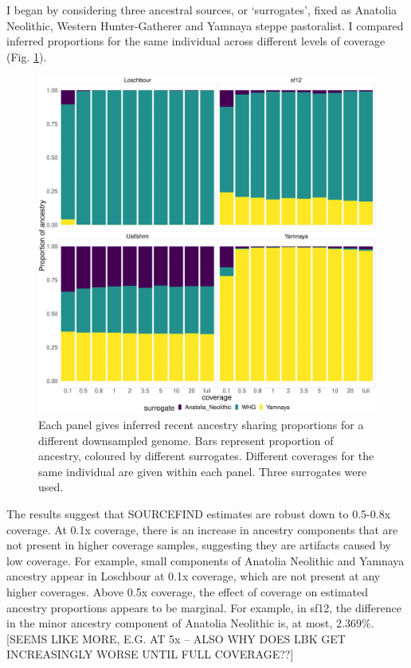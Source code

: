 I began by considering three ancestral sources, or `surrogates', fixed as Anatolia Neolithic, Western Hunter-Gatherer and Yamnaya steppe pastoralist. I compared inferred proportions for the same individual across different levels of coverage (Fig. \ref{fig:3pop_SF_downsampled}). 

\begin{figure}[htp]
    \centering
    \includegraphics[width=1.0\textwidth]{../images/chapter1/3pop_SF_downsampled.pdf}
    \caption{Each panel gives inferred recent ancestry sharing proportions for a different downsampled genome. Bars represent proportion of ancestry, coloured by different surrogates. Different coverages for the same individual are given within each panel. Three surrogates were used.}
    \label{fig:3pop_SF_downsampled}
\end{figure}

The results suggest that SOURCEFIND estimates are robust down to 0.5-0.8x coverage. At 0.1x coverage, there is an increase in ancestry components that are not present in higher coverage samples, suggesting they are artifacts caused by low coverage. For example, small components of Anatolia Neolithic and Yamnaya ancestry appear in Loschbour at 0.1x coverage, which are not present at any higher coverages. Above 0.5x coverage, the effect of coverage on estimated ancestry proportions appears to be marginal. For example, in sf12, the difference in the minor ancestry component of Anatolia Neolithic is, at most, 2.369\%.{\color{red}[SEEMS LIKE MORE, E.G. AT 5x -- ALSO WHY DOES LBK GET INCREASINGLY WORSE UNTIL FULL COVERAGE??]} 

